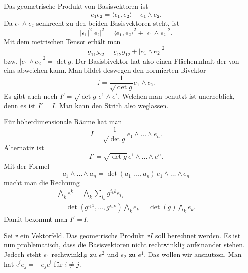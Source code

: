 \documentclass[a4paper,10pt,fleqn,twocolumn,twoside]{article}
\numberwithin{equation}{section}
\begin{document}
Das geometrische Produkt von Basisvektoren ist
\begin{equation}
e_1e_2 = \langle e_1,e_2\rangle + e_1\wedge e_2.
\end{equation}
Da $e_1\wedge e_2$ senkrecht zu den beiden Basisvektoren steht, ist
\begin{equation}
|e_1|^2|e_2|^2 = \langle e_1,e_2\rangle^2+|e_1\wedge e_2|^2.
\end{equation}
Mit dem metrischen Tensor erhält man
\begin{equation}
g_{11} g_{22} = g_{12} g_{12} + |e_1\wedge e_2|^2
\end{equation}
bzw. $|e_1\wedge e_2|^2 = \det g.$
Der Basisbivektor hat also einen Flächeninhalt der von eins abweichen
kann. Man bildet deswegen den normierten Bivektor
\begin{equation}
I = \frac{1}{\sqrt{\det g}}e_1\wedge e_2.
\end{equation}
Es gibt auch noch $I'=\sqrt{\det g}\,e^1\wedge e^2$. Welchen man
benutzt ist unerheblich, denn es ist $I'=I$. Man kann den Strich
also weglassen.

Für höherdimensionale Räume hat man
\begin{equation}
I = \frac{1}{\sqrt{\det g}}e_1\wedge\ldots\wedge e_n.
\end{equation}
Alternativ ist
\begin{equation}
I' = \sqrt{\det g}\,e^1\wedge\ldots\wedge e^n.
\end{equation}
Mit der Formel
\begin{equation}
a_1\wedge\ldots\wedge a_n
= \det(a_1,\ldots,a_n)\,e_1\wedge\ldots\wedge e_n
\end{equation}
macht man die Rechnung
\begin{gather*}
\bigwedge_k e^k
= \bigwedge_k \sum_{i_k} g^{{i_k}k} e_{i_k}\\
= \det(g^{{i_1}1},\ldots,g^{{i_n}n})\bigwedge_k e_k
= \det(g)\bigwedge_k e_k.
\end{gather*}
Damit bekommt man $I'=I$.

Sei $v$ ein Vektorfeld. Das geometrische Produkt $vI$
soll berechnet werden. Es ist nun problematisch, dass die
Basisvektoren nicht rechtwinklig aufeinander stehen. Jedoch
steht $e_1$ rechtwinklig zu $e^2$ und $e_2$ zu $e^1$.
Das wollen wir ausnutzen. Man hat $e^ie_j=-e_je^i$ für $i\ne j$.
\end{document}
